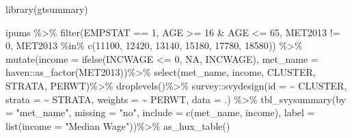 \documentclass[
  letterpaper,
  DIV=11,
  numbers=noendperiod]{scrreprt}
\newenvironment{Shaded}{\begin{snugshade}}{\end{snugshade}}
\newcommand{\AttributeTok}[1]{\textcolor[rgb]{0.40,0.45,0.13}{#1}}
\newcommand{\ConstantTok}[1]{\textcolor[rgb]{0.56,0.35,0.01}{#1}}
\newcommand{\DecValTok}[1]{\textcolor[rgb]{0.68,0.00,0.00}{#1}}
\newcommand{\FunctionTok}[1]{\textcolor[rgb]{0.28,0.35,0.67}{#1}}
\newcommand{\NormalTok}[1]{\textcolor[rgb]{0.00,0.23,0.31}{#1}}
\newcommand{\SpecialCharTok}[1]{\textcolor[rgb]{0.37,0.37,0.37}{#1}}
\newcommand{\StringTok}[1]{\textcolor[rgb]{0.13,0.47,0.30}{#1}}
\begin{document}
\begin{Shaded}
\begin{Highlighting}[]
\FunctionTok{library}\NormalTok{(gtsummary)}

\NormalTok{ipums }\SpecialCharTok{\%\textgreater{}\%}
 \FunctionTok{filter}\NormalTok{(EMPSTAT }\SpecialCharTok{==} \DecValTok{1}\NormalTok{,}
\NormalTok{         AGE }\SpecialCharTok{\textgreater{}=} \DecValTok{16} \SpecialCharTok{\&}\NormalTok{ AGE }\SpecialCharTok{\textless{}=} \DecValTok{65}\NormalTok{, }
\NormalTok{         MET2013 }\SpecialCharTok{!=} \DecValTok{0}\NormalTok{, }
\NormalTok{         MET2013 }\SpecialCharTok{\%in\%} \FunctionTok{c}\NormalTok{(}\DecValTok{11100}\NormalTok{, }\DecValTok{12420}\NormalTok{, }\DecValTok{13140}\NormalTok{, }\DecValTok{15180}\NormalTok{, }\DecValTok{17780}\NormalTok{, }\DecValTok{18580}\NormalTok{)) }\SpecialCharTok{\%\textgreater{}\%} 
  \FunctionTok{mutate}\NormalTok{(}\AttributeTok{income =} \FunctionTok{ifelse}\NormalTok{(INCWAGE }\SpecialCharTok{\textless{}=} \DecValTok{0}\NormalTok{, }\ConstantTok{NA}\NormalTok{, INCWAGE),}
         \AttributeTok{met\_name =}\NormalTok{ haven}\SpecialCharTok{::}\FunctionTok{as\_factor}\NormalTok{(MET2013))}\SpecialCharTok{\%\textgreater{}\%}
  \FunctionTok{select}\NormalTok{(met\_name,  income, CLUSTER, STRATA, PERWT)}\SpecialCharTok{\%\textgreater{}\%}
  \FunctionTok{droplevels}\NormalTok{()}\SpecialCharTok{\%\textgreater{}\%}
\NormalTok{  survey}\SpecialCharTok{::}\FunctionTok{svydesign}\NormalTok{(}\AttributeTok{id =} \SpecialCharTok{\textasciitilde{}}\NormalTok{ CLUSTER,}
                   \AttributeTok{strata =} \SpecialCharTok{\textasciitilde{}}\NormalTok{ STRATA,}
                   \AttributeTok{weights =} \SpecialCharTok{\textasciitilde{}}\NormalTok{ PERWT,}
                \AttributeTok{data =}\NormalTok{ .) }\SpecialCharTok{\%\textgreater{}\%}
   \FunctionTok{tbl\_svysummary}\NormalTok{(}\AttributeTok{by =} \StringTok{"met\_name"}\NormalTok{,}
                  \AttributeTok{missing =} \StringTok{"no"}\NormalTok{,}
                  \AttributeTok{include =} \FunctionTok{c}\NormalTok{(met\_name, income), }
                  \AttributeTok{label =} \FunctionTok{list}\NormalTok{(}\AttributeTok{income =} \StringTok{"Median Wage"}\NormalTok{))}\SpecialCharTok{\%\textgreater{}\%}
  \FunctionTok{as\_hux\_table}\NormalTok{()}
\end{Highlighting}
\end{Shaded}

 
  \providecommand{\huxb}[2]{\arrayrulecolor[RGB]{#1}\global\arrayrulewidth=#2pt}
  \providecommand{\huxvb}[2]{\color[RGB]{#1}\vrule width #2pt}
  \providecommand{\huxtpad}[1]{\rule{0pt}{#1}}
  \providecommand{\huxbpad}[1]{\rule[-#1]{0pt}{#1}}
\end{document}
